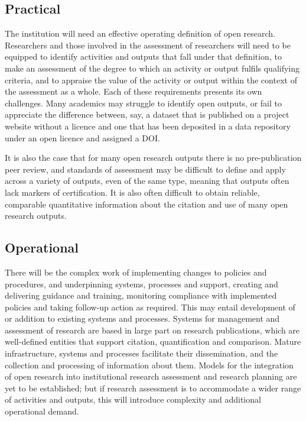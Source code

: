 \documentclass[
  letterpaper,
  DIV=11,
  numbers=noendperiod,
  oneside]{scrreprt}
\begin{document}
\subsection{Practical}\label{practical}

The institution will need an effective operating definition of open
research. Researchers and those involved in the assessment of
researchers will need to be equipped to identify activities and outputs
that fall under that definition, to make an assessment of the degree to
which an activity or output fulfils qualifying criteria, and to appraise
the value of the activity or output within the context of the assessment
as a whole. Each of these requirements presents its own challenges. Many
academics may struggle to identify open outputs, or fail to appreciate
the difference between, say, a dataset that is published on a project
website without a licence and one that has been deposited in a data
repository under an open licence and assigned a DOI.

It is also the case that for many open research outputs there is no
pre-publication peer review, and standards of assessment may be
difficult to define and apply across a variety of outputs, even of the
same type, meaning that outputs often lack markers of certification. It
is also often difficult to obtain reliable, comparable quantitative
information about the citation and use of many open research outputs.

\subsection{Operational}\label{operational}

There will be the complex work of implementing changes to policies and
procedures, and underpinning systems, processes and support, creating
and delivering guidance and training, monitoring compliance with
implemented policies and taking follow-up action as required. This may
entail development of or addition to existing systems and processes.
Systems for management and assessment of research are based in large
part on research publications, which are well-defined entities that
support citation, quantification and comparison. Mature infrastructure,
systems and processes facilitate their dissemination, and the collection
and processing of information about them. Models for the integration of
open research into institutional research assessment and research
planning are yet to be established; but if research assessment is to
accommodate a wider range of activities and outputs, this will introduce
complexity and additional operational demand.
\end{document}
